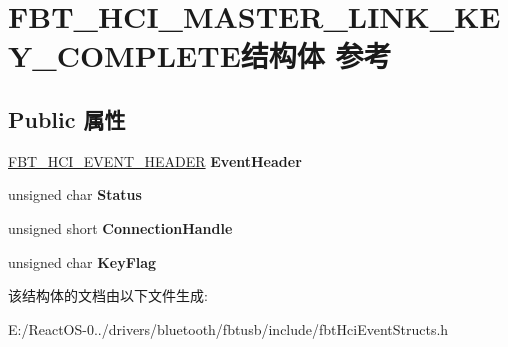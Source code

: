 \hypertarget{struct_f_b_t___h_c_i___m_a_s_t_e_r___l_i_n_k___k_e_y___c_o_m_p_l_e_t_e}{}\section{F\+B\+T\+\_\+\+H\+C\+I\+\_\+\+M\+A\+S\+T\+E\+R\+\_\+\+L\+I\+N\+K\+\_\+\+K\+E\+Y\+\_\+\+C\+O\+M\+P\+L\+E\+T\+E结构体 参考}
\label{struct_f_b_t___h_c_i___m_a_s_t_e_r___l_i_n_k___k_e_y___c_o_m_p_l_e_t_e}
\subsection*{Public 属性}
\begin{DoxyCompactItemize}
\item 
\mbox{\label{struct_f_b_t___h_c_i___m_a_s_t_e_r___l_i_n_k___k_e_y___c_o_m_p_l_e_t_e_adf810eb32ba3cf2fa35b956fd2c2f836}} 
\hyperlink{struct_f_b_t___h_c_i___e_v_e_n_t___h_e_a_d_e_r}{F\+B\+T\+\_\+\+H\+C\+I\+\_\+\+E\+V\+E\+N\+T\+\_\+\+H\+E\+A\+D\+ER} {\bfseries Event\+Header}
\item 
\mbox{\label{struct_f_b_t___h_c_i___m_a_s_t_e_r___l_i_n_k___k_e_y___c_o_m_p_l_e_t_e_a285dfca3273b3c7e467083ca19d69bca}} 
unsigned char {\bfseries Status}
\item 
\mbox{\label{struct_f_b_t___h_c_i___m_a_s_t_e_r___l_i_n_k___k_e_y___c_o_m_p_l_e_t_e_a150fe38390282e23fe7e7e7ac6f2e6e4}} 
unsigned short {\bfseries Connection\+Handle}
\item 
\mbox{\label{struct_f_b_t___h_c_i___m_a_s_t_e_r___l_i_n_k___k_e_y___c_o_m_p_l_e_t_e_a0ae0bf42f5e922cec852718de6454621}} 
unsigned char {\bfseries Key\+Flag}
\end{DoxyCompactItemize}


该结构体的文档由以下文件生成\+:\begin{DoxyCompactItemize}
\item 
E\+:/\+React\+O\+S-\/0../drivers/bluetooth/fbtusb/include/fbt\+Hci\+Event\+Structs.\+h\end{DoxyCompactItemize}

